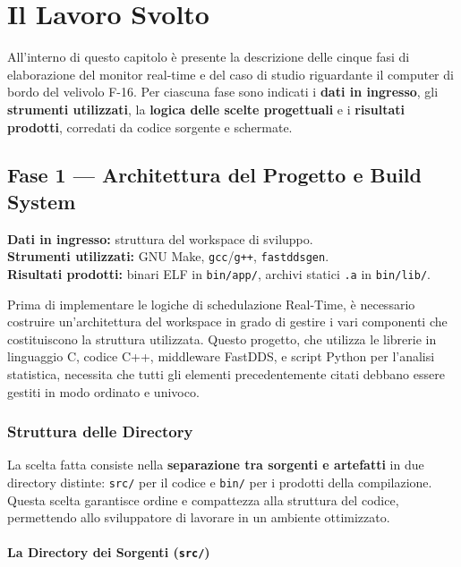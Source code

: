 \chapter{Il Lavoro Svolto}
\label{ch:lavoro_svolto}
All'interno di questo capitolo è presente la descrizione delle cinque fasi di elaborazione del monitor real-time e del caso di studio riguardante il computer di bordo del velivolo F-16. Per ciascuna fase sono indicati i \textbf{dati in ingresso}, gli \textbf{strumenti utilizzati}, la \textbf{logica delle scelte progettuali} e i \textbf{risultati prodotti}, corredati da codice sorgente e schermate.

\section{Fase 1 --- Architettura del Progetto e Build System}
\label{sec:fase1_build}

\noindent\textbf{Dati in ingresso:} struttura del workspace di sviluppo.\\
\textbf{Strumenti utilizzati:} GNU Make, \texttt{gcc}/\texttt{g++}, \texttt{fastddsgen}.\\
\textbf{Risultati prodotti:} binari ELF in \texttt{bin/app/}, archivi statici \texttt{.a} in \texttt{bin/lib/}.

\bigskip

Prima di implementare le logiche di schedulazione Real-Time, è necessario costruire un'architettura del workspace in grado di gestire i vari componenti che costituiscono la struttura utilizzata. Questo progetto, che utilizza le librerie in linguaggio C, codice C++, middleware FastDDS, e script Python per l'analisi statistica, necessita che tutti gli elementi precedentemente citati debbano essere gestiti in modo ordinato e univoco.

\subsection{Struttura delle Directory}

La scelta fatta consiste nella \textbf{separazione tra sorgenti e artefatti} in due directory distinte: \texttt{src/} per il codice e \texttt{bin/} per i prodotti della compilazione. Questa scelta garantisce ordine e compattezza alla struttura del codice, permettendo allo sviluppatore di lavorare in un ambiente ottimizzato.

\subsubsection{La Directory dei Sorgenti (\texttt{src/})}

